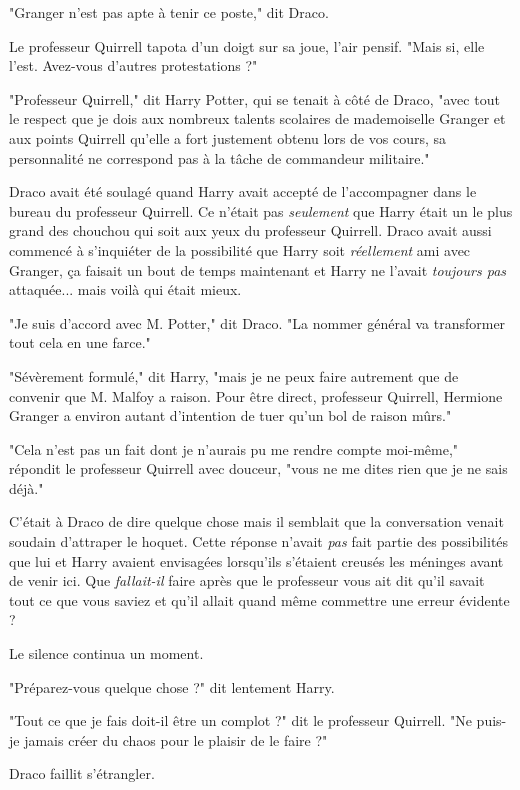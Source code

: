 "Granger n'est pas apte à tenir ce poste," dit Draco.

Le professeur Quirrell tapota d'un doigt sur sa joue, l'air pensif. "Mais si, elle l'est. Avez-vous d'autres protestations ?"

"Professeur Quirrell," dit Harry Potter, qui se tenait à côté de Draco, "avec tout le respect que je dois aux nombreux talents scolaires de mademoiselle Granger et aux points Quirrell qu'elle a fort justement obtenu lors de vos cours, sa personnalité ne correspond pas à la tâche de commandeur militaire."

Draco avait été soulagé quand Harry avait accepté de l'accompagner dans le bureau du professeur Quirrell. Ce n'était pas \emph{seulement}  que Harry était un le plus grand des chouchou qui soit aux yeux du professeur Quirrell. Draco avait aussi commencé à s'inquiéter de la possibilité que Harry soit \emph{réellement}  ami avec Granger, ça faisait un bout de temps maintenant et Harry ne l'avait \emph{toujours pas}  attaquée... mais voilà qui était mieux.

"Je suis d'accord avec M. Potter," dit Draco. "La nommer général va transformer tout cela en une farce."

"Sévèrement formulé," dit Harry, "mais je ne peux faire autrement que de convenir que M. Malfoy a raison. Pour être direct, professeur Quirrell, Hermione Granger a environ autant d'intention de tuer qu'un bol de raison mûrs."

"Cela n'est pas un fait dont je n'aurais pu me rendre compte moi-même," répondit le professeur Quirrell avec douceur, "vous ne me dites rien que je ne sais déjà."

C'était à Draco de dire quelque chose mais il semblait que la conversation venait soudain d'attraper le hoquet. Cette réponse n'avait \emph{pas}  fait partie des possibilités que lui et Harry avaient envisagées lorsqu'ils s'étaient creusés les méninges avant de venir ici. Que \emph{fallait-il}  faire après que le professeur vous ait dit qu'il savait tout ce que vous saviez et qu'il allait quand même commettre une erreur évidente ?

Le silence continua un moment.

"Préparez-vous quelque chose ?" dit lentement Harry.

"Tout ce que je fais doit-il être un complot ?" dit le professeur Quirrell. "Ne puis-je jamais créer du chaos pour le plaisir de le faire ?"

Draco faillit s'étrangler.


